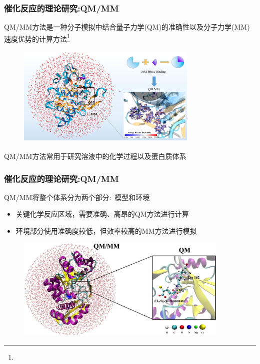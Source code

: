 \frame
{
	\frametitle{催化反应的理论研究:\textrm{QM/MM}}
	\textrm{QM/MM}方法是一种分子模拟中结合量子力学\textrm{(QM)}的准确性以及分子力学\textrm{(MM)}速度优势的计算方法\footnote{\fontsize{6.0pt}{4.2pt}}
\begin{figure}[h!]
\centering
\vspace{-10.5pt}
\includegraphics[height=1.90in,width=3.40in,viewport=0 0 240 140,clip]{Figures/QM-MM_part.jpg}
\label{QM-MM_depart}
\end{figure}
\textrm{QM/MM}方法常用于研究溶液中的化学过程以及蛋白质体系
}

\frame
{
	\frametitle{催化反应的理论研究:\textrm{QM/MM}}
	\textrm{QM/MM}将整个体系分为两个部分:~模型和环境
	\begin{itemize}
		\item 关键化学反应区域，需要准确、高昂的\textrm{QM}方法进行计算
		\item 环境部分使用准确度较低，但效率较高的\textrm{MM}方法进行模拟
	\end{itemize}
\begin{figure}[h!]
\centering
\vspace{-10.5pt}
\includegraphics[height=1.92in,width=4.0in,viewport=0 0 280 130,clip]{Figures/QM_MM-2.jpg}
\label{QM-MM-surface}
\end{figure}
}


